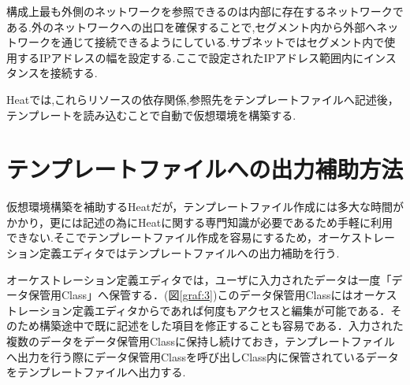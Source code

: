 \documentclass[mingoth]{kut-paper}		%
\begin{document}
	
	構成上最も外側のネットワークを参照できるのは内部に存在するネットワークである.外のネットワークへの出口を確保することで,セグメント内から外部へネットワークを通じて接続できるようにしている.サブネットではセグメント内で使用するIPアドレスの幅を設定する.ここで設定されたIPアドレス範囲内にインスタンスを接続する.
	
	Heatでは,これらリソースの依存関係,参照先をテンプレートファイルへ記述後，テンプレートを読み込むことで自動で仮想環境を構築する.
	\section{テンプレートファイルへの出力補助方法}
	仮想環境構築を補助するHeatだが，テンプレートファイル作成には多大な時間がかかり，更には記述の為にHeatに関する専門知識が必要であるため手軽に利用できない.そこでテンプレートファイル作成を容易にするため，オーケストレーション定義エディタではテンプレートファイルへの出力補助を行う.
	
	オーケストレーション定義エディタでは，ユーザに入力されたデータは一度「データ保管用Class」へ保管する．(図\ref{graf:3})このデータ保管用Classにはオーケストレーション定義エディタからであれば何度もアクセスと編集が可能である．そのため構築途中で既に記述をした項目を修正することも容易である．入力された複数のデータをデータ保管用Classに保持し続けておき，テンプレートファイルへ出力を行う際にデータ保管用Classを呼び出しClass内に保管されているデータをテンプレートファイルへ出力する.
	
\end{document}
